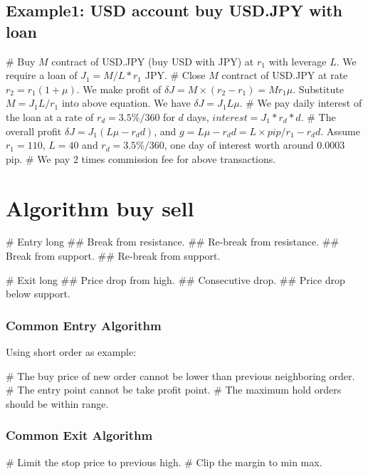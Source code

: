 \subsection*{Example1: USD account buy USD.JPY with loan}
\begin{listb}
# Buy $M$ contract of USD.JPY (buy USD with JPY) at $r_1$ with leverage $L$. We require a loan of $J_1=M/L*r_1$ JPY.  
# Close $M$ contract of USD.JPY at rate $r_2 = r_1(1+\mu)$. We make profit of $\delta J = M\times (r_2-r_1)=Mr_1\mu$. Substitute  $M=J_1L/r_1$ into above equation. We have $\delta J=J_1L\mu$.
# We pay daily interest of the loan at a rate of $r_d=3.5\%/360$ for $d$ days, $interest = J_1*r_d*d$.
# The overall profit $\delta J=J_1(L\mu-r_dd)$, and $g=L\mu-r_dd=L\times pip/r_1 - r_dd$. Assume $r_1=110$, $L=40$ and $r_d=3.5\%/360$, one day of interest worth around 0.0003 pip. 
# We pay 2 times commission fee for above transactions.
\end{listb}

\section{Algorithm buy sell}
\begin{listb}
# Entry long
## Break from resistance.
## Re-break from resistance.
## Break from support.
## Re-break from support.

# Exit long
## Price drop from high.
## Consecutive drop.
## Price drop below support. 
\end{listb}

\subsubsection{Common Entry Algorithm}

Using short order as example:
\begin{listb}
# The buy price of new order cannot be lower than previous neighboring order.
# The entry point cannot be take profit point. 
# The maximum hold orders should be within range.
\end{listb}

\subsubsection{Common Exit Algorithm}
\begin{listb}
# Limit the stop price to previous high.
# Clip the margin to min max.
\end{listb}


